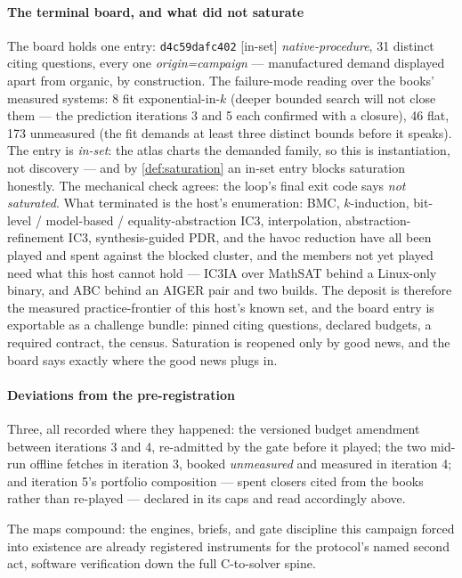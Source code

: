 \paragraph{The terminal board, and what did not saturate}
The board holds one entry: \texttt{d4c59dafc402} [in-set]
\emph{native-procedure}, 31 distinct citing questions, every one
\textit{origin=campaign} --- manufactured demand displayed apart
from organic, by construction. The failure-mode reading over the
books' measured systems: 8 fit exponential-in-$k$ (deeper bounded
search will not close them --- the prediction iterations 3 and 5
each confirmed with a closure), 46 flat, 173 unmeasured (the fit
demands at least three distinct bounds before it speaks). The entry
is \emph{in-set}: the atlas charts the demanded family, so this is
instantiation, not discovery --- and by \cref{def:saturation} an
in-set entry blocks saturation honestly. The mechanical check
agrees: the loop's final exit code says \emph{not saturated}. What
terminated is the host's enumeration: BMC, $k$-induction, bit-level
/ model-based / equality-abstraction IC3, interpolation,
abstraction-refinement IC3, synthesis-guided PDR, and the havoc
reduction have all been played and spent against the blocked
cluster, and the members not yet played need what this host cannot
hold --- IC3IA over MathSAT behind a Linux-only binary, and ABC
behind an AIGER pair and two builds. The deposit is therefore the
measured practice-frontier of this host's known set, and the board
entry is exportable as a challenge bundle: pinned citing questions,
declared budgets, a required contract, the census. Saturation is
reopened only by good news, and the board says exactly where the
good news plugs in.

\paragraph{Deviations from the pre-registration}
Three, all recorded where they happened: the versioned budget
amendment between iterations 3 and 4, re-admitted by the gate before
it played; the two mid-run offline fetches in iteration 3, booked
\textit{unmeasured} and measured in iteration 4; and iteration 5's
portfolio composition --- spent closers cited from the books rather
than re-played --- declared in its caps and read accordingly above.

The maps compound: the engines, briefs, and gate discipline this
campaign forced into existence are already registered instruments
for the protocol's named second act, software verification down the
full C-to-solver spine.
